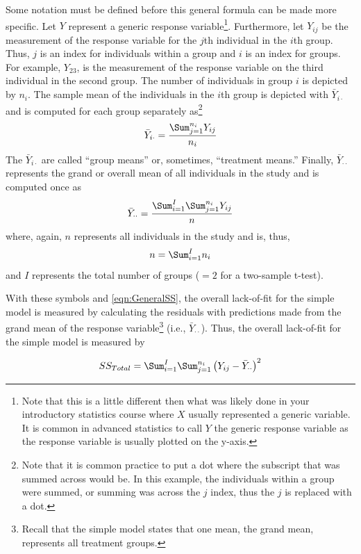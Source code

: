 \documentclass[10pt,openany]{book}\usepackage[]{graphicx}\usepackage[]{color}
\begin{document}
\vspace{-12pt}

Some notation must be defined before this general formula can be made more specific.  Let $Y$ represent a generic response variable\footnote{Note that this is a little different then what was likely done in your introductory statistics course where $X$ usually represented a generic variable.  It is common in advanced statistics to call $Y$ the generic response variable as the response variable is usually plotted on the y-axis.}.  Furthermore, let $Y_{ij}$ be the measurement of the response variable for the $j$th individual in the $i$th group.  Thus, $j$ is an index for individuals within a group and $i$ is an index for groups.  For example, $Y_{23}$, is the measurement of the response variable on the third individual in the second group.  The number of individuals in group $i$ is depicted by $n_{i}$.  The sample mean of the individuals in the $i$th group is depicted with $\bar{Y}_{i\cdot}$ and is computed for each group separately as\footnote{Note that it is common practice to put a dot where the subscript that was summed across would be.  In this example, the individuals within a group were summed, or summing was across the $j$ index, thus the $j$ is replaced with a dot.}
\[ \bar{Y}_{i\cdot}= \frac{\Sum_{j=1}^{n_{i}}Y_{ij}}{n_{i}} \]
The $\bar{Y}_{i\cdot}$ are called ``group means'' or, sometimes, ``treatment means.''  Finally, $\bar{Y}_{\cdot\cdot}$ represents the grand or overall mean of all individuals in the study and is computed once as
\[ \bar{Y}_{\cdot\cdot}= \frac{\Sum_{i=1}^{I}\Sum_{j=1}^{n_{i}}Y_{ij}}{n} \]
where, again, $n$ represents all individuals in the study and is, thus,
\[ n = \Sum_{i=1}^{I}n_{i} \]
and $I$ represents the total number of groups ($=2$ for a two-sample t-test).

With these symbols and \eqref{eqn:GeneralSS}, the overall lack-of-fit for the simple model is measured by calculating the residuals with predictions made from the grand mean of the response variable\footnote{Recall that the simple model states that one mean, the grand mean, represents all treatment groups.} (i.e., $\bar{Y}_{\cdot\cdot}$).  Thus, the overall lack-of-fit for the simple model is measured by

\begin{equation} \label{eqn:SStotal}
  SS_{Total} = \Sum_{i=1}^{I}\Sum_{j=1}^{n_{i}}\left(Y_{ij}-\bar{Y}_{\cdot\cdot}\right)^{2}
\end{equation}
\end{document}
